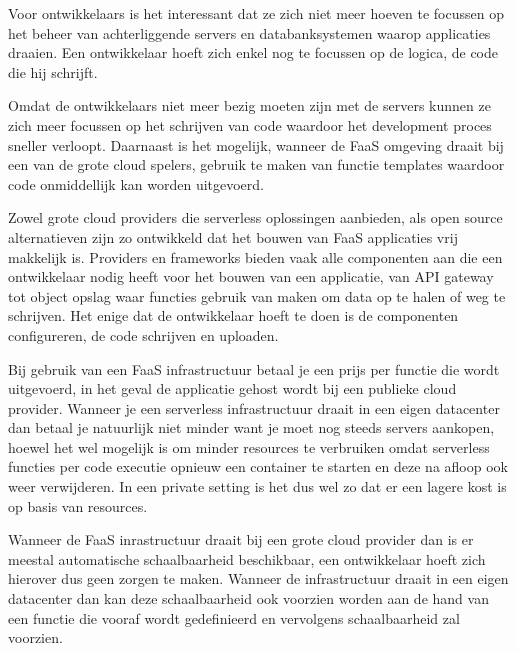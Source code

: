 \begin{description}[style=unboxed, labelwidth=\linewidth, listparindent =0pt]
    \item[Geen beheer van infrastructuur]
    Voor ontwikkelaars is het interessant dat ze zich niet meer hoeven te focussen op het beheer van achterliggende servers en databanksystemen waarop applicaties draaien. Een ontwikkelaar hoeft zich enkel nog te focussen op de logica, de code die hij schrijft.
    \newline
    
    \item [Snellere development en deployment]
    Omdat de ontwikkelaars niet meer bezig moeten zijn met de servers kunnen ze zich meer focussen op het schrijven van code waardoor het development proces sneller verloopt. Daarnaast is het mogelijk, wanneer de FaaS omgeving draait bij een van de grote cloud spelers, gebruik te maken van functie templates waardoor code onmiddellijk kan worden uitgevoerd.
    \newline
    
    \item [Makkelijk in gebruik]
    Zowel grote cloud providers die serverless oplossingen aanbieden, als open source alternatieven zijn zo ontwikkeld dat het bouwen van FaaS applicaties vrij makkelijk is. Providers en frameworks bieden vaak alle componenten aan die een ontwikkelaar nodig heeft voor het bouwen van een applicatie, van API gateway tot object opslag waar functies gebruik van maken om data op te halen of weg te schrijven. Het enige dat de ontwikkelaar hoeft te doen is de componenten configureren, de code schrijven en uploaden.
    \newline
    
    \item [Lagere kosten]
    Bij gebruik van een FaaS infrastructuur betaal je een prijs per functie die wordt uitgevoerd, in het geval de applicatie gehost wordt bij een publieke cloud provider. Wanneer je een serverless infrastructuur draait in een eigen datacenter dan betaal je natuurlijk niet minder want je moet nog steeds servers aankopen, hoewel het wel mogelijk is om minder resources te verbruiken omdat serverless functies per code executie opnieuw een container te starten en deze na afloop ook weer verwijderen. In een private setting is het dus wel zo dat er een lagere kost is op basis van resources.
    \newline
    
     \item [Verbeterde schaalbaarheid]
     Wanneer de FaaS inrastructuur draait bij een grote cloud provider dan is er meestal automatische schaalbaarheid beschikbaar, een ontwikkelaar hoeft zich hierover dus geen zorgen te maken. Wanneer de infrastructuur draait in een eigen datacenter dan kan deze schaalbaarheid ook voorzien worden aan de hand van een functie die vooraf wordt gedefinieerd en vervolgens schaalbaarheid zal voorzien.
     \newline 
\end{description}

